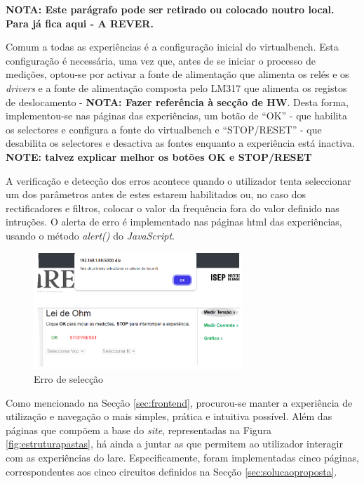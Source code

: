 
\textbf{NOTA: Este parágrafo pode ser retirado ou colocado noutro local. Para já fica aqui - A REVER.}

Comum a todas as experiências é a configuração inicial do \acrshort{virtualbench}. Esta configuração é necessária, uma vez que, antes de se iniciar o processo de medições, optou-se por activar a fonte de alimentação que alimenta os relés e os \textit{drivers} e a fonte de alimentação composta pelo LM317 que alimenta os registos de deslocamento - \textbf{NOTA: Fazer referência à secção de HW}. Desta forma, implementou-se nas páginas das experiências, um botão de ``OK'' - que habilita os selectores e configura a fonte do \acrshort{virtualbench} e ``STOP/RESET'' - que desabilita os selectores e desactiva as fontes enquanto a experiência está inactiva. \textbf{NOTE: talvez explicar melhor os botões OK e STOP/RESET}

A verificação e detecção dos erros acontece quando o utilizador tenta seleccionar um dos parâmetros antes de estes estarem habilitados ou, no caso dos rectificadores e filtros, colocar o valor da frequência fora do valor definido nas intruções. O alerta de erro é implementado nas páginas \acrshort{html} das experiências, usando o método \textit{alert()} do \textit{JavaScript}.

\begin{figure}[hbtp]
	\centering
	\includegraphics[width=0.7\textwidth]{figures/erro_pagina.png}
	\caption{Erro de selecção}
	\label{fig:erropagina}
\end{figure}


Como mencionado na Secção \ref{sec:frontend}, procurou-se manter a experiência de utilização e navegação o mais simples, prática e intuitiva possível. Além das páginas que compõem a base do \textit{site}, representadas na Figura \ref{fig:estruturapastas}, há ainda a juntar as que permitem ao utilizador interagir com as experiências do \acrshort{lare}. Especificamente, foram implementadas cinco páginas, correspondentes aos cinco circuitos definidos na Secção \ref{sec:solucaoproposta}.

